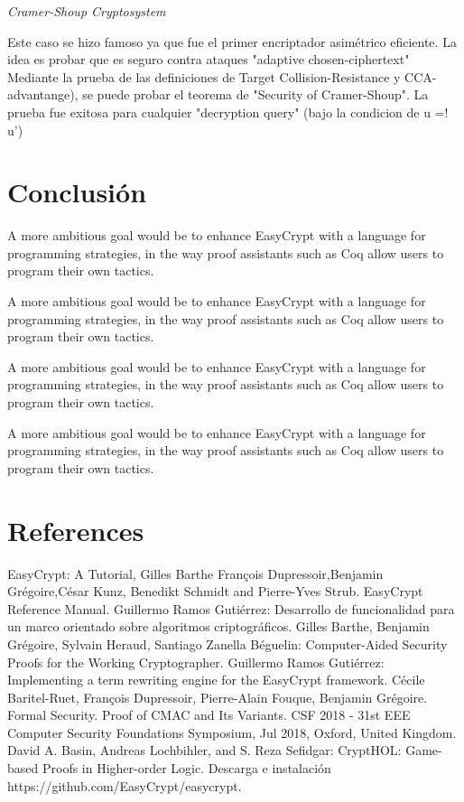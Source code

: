 \documentclass[runningheads,a4paper]{llncs}
\begin{document}
\centerline{\emph{Cramer-Shoup Cryptosystem}}

Este caso se hizo famoso ya que fue el primer encriptador asimétrico eficiente. La idea es probar que es seguro contra ataques "adaptive chosen-ciphertext"
Mediante la prueba de las definiciones de Target Collision-Resistance y CCA-advantange), se puede probar el teorema de "Security of Cramer-Shoup".
La prueba fue exitosa para cualquier "decryption query" (bajo la condicion de u =! u')\cite{article5}


\section{Conclusión}

A more ambitious goal
would be to enhance EasyCrypt with a language for programming strategies, in
the way proof assistants such as Coq allow users to program their own tactics.

A more ambitious goal
would be to enhance EasyCrypt with a language for programming strategies, in
the way proof assistants such as Coq allow users to program their own tactics.

A more ambitious goal
would be to enhance EasyCrypt with a language for programming strategies, in
the way proof assistants such as Coq allow users to program their own tactics.

A more ambitious goal
would be to enhance EasyCrypt with a language for programming strategies, in
the way proof assistants such as Coq allow users to program their own tactics.

\section{References}

\begin{thebibliography}{1}
EasyCrypt: A Tutorial, 
Gilles Barthe
François Dupressoir,Benjamin Grégoire,César Kunz, 
Benedikt Schmidt and Pierre-Yves Strub.
EasyCrypt Reference Manual.
Guillermo Ramos Gutiérrez: Desarrollo de  funcionalidad para un marco orientado sobre algoritmos criptográficos.
Gilles Barthe, Benjamin Grégoire, Sylvain Heraud, Santiago Zanella Béguelin: Computer-Aided Security Proofs
for the Working Cryptographer.
Guillermo Ramos Gutiérrez: Implementing a term rewriting
engine for the EasyCrypt framework.
Cécile Baritel-Ruet, François Dupressoir, Pierre-Alain Fouque, Benjamin Grégoire. Formal Security.
Proof of CMAC and Its Variants. CSF 2018 - 31st EEE Computer Security Foundations Symposium,
Jul 2018, Oxford, United Kingdom.
David A. Basin, Andreas Lochbihler, and S. Reza Sefidgar: CryptHOL: Game-based Proofs in
Higher-order Logic.
Descarga e instalación https://github.com/EasyCrypt/easycrypt. 
\end{thebibliography}
\end{document}
